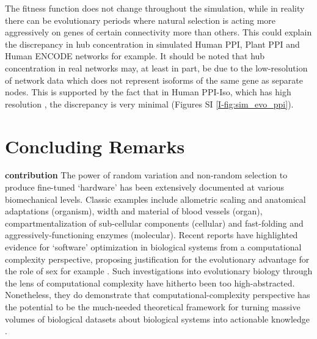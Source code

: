 \documentclass[12pt]{article}
\begin{document}
The fitness function does not change throughout the simulation, while in reality there can be evolutionary periods where natural selection is acting more aggressively on genes of certain connectivity more than others. This could explain the discrepancy in hub concentration in simulated Human PPI, Plant PPI and Human ENCODE networks for example. It should be noted that hub concentration in real networks may, at least in part, be due to the low-resolution of network data which does not represent isoforms of the same gene as separate nodes. This is supported by the fact that in Human PPI-Iso, which has high resolution \cite{yang_widespread_2016}, the discrepancy is very minimal (Figures SI \ref{I-fig:sim_evo_ppi}).

\section{Concluding Remarks}
\textbf{contribution} The power of random variation and non-random selection to produce fine-tuned `hardware' has been extensively documented at various biomechanical levels. Classic examples include allometric scaling and anatomical adaptations (organism), width and material of blood vessels (organ), compartmentalization of sub-cellular components (cellular) and fast-folding and aggressively-functioning enzymes (molecular). Recent reports \cite{livnat_analytical_2011, chastain_algorithms_2014} have highlighted evidence for `software' optimization in biological systems from a computational complexity perspective, proposing justification for the evolutionary advantage for the role of sex for example \cite{livnat_sex_2016}. Such investigations into evolutionary biology through the lens of computational complexity have hitherto been too high-abstracted. Nonetheless, they do demonstrate that computational-complexity perspective has the potential to be the much-needed theoretical framework for turning massive volumes of biological datasets about biological systems into actionable knowledge \cite{brenner_turing_2012}.
\end{document}

